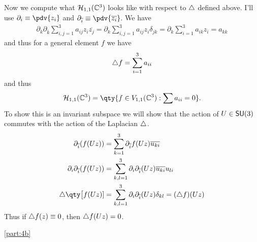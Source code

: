 \documentclass[
	pages,
	boxes,
	color=WildStrawberry
]{homework}
\theoremstyle{plain}
\begin{document}
\begin{solution}
	Now we compute what $\mathcal{H}_{1,1}(\mathbb{C}^3)$ looks like with respect to $\triangle$ defined above. I'll use $\partial_i\equiv \pdv{z_i}$ and $\partial_{\overline{i}}\equiv \pdv{\overline{z_i}}$. We have
	\begin{align*}
		\partial_k \partial_{\overline{k}}\sum_{i,j=1}^3 a_{ij}z_i\overline{z_j} = \partial_k \sum_{i,j=1}^3 a_{ij}z_i\delta_{jk} = \partial_k \sum_{i=1}^3a_{ik}z_i = a_{kk}
	\end{align*}
	and thus for a general element $f$ we have
	\begin{align*}
		\triangle{f} = \sum_{i=1}^3a_{ii}
	\end{align*}
	and thus
	\begin{equation*}
		\mathcal{H}_{1,1}(\C^3) = \qty{f\in V_{1,1}(\C^3) : \sum a_{ii} = 0}.
	\end{equation*}
	To show this is an invariant subspace we will show that the action of $U\in \mathsf{SU}(3)$ commutes with the action of the Laplacian $\triangle$.
	\begin{align*}
		\partial_{\overline{i}}(f(Uz))           & = \sum_{k = 1}^3 \partial_{\overline{i}}f(Uz)\overline{u_{ki}}                          \\
		\partial_i\partial_{\overline{i}}(f(Uz)) & = \sum_{k, l = 1}^3\partial_i\partial_{\overline{i}}(Uz)\overline{u_{ki}}u_{li}         \\
		\laplace{\qty\big[f(Uz)]}                & = \sum_{k, l = 1}^3\partial_i\partial_{\overline{i}}(Uz)\delta_{kl} = (\laplace{f})(Uz)
	\end{align*}
	Thus if $\triangle{f}(z)\equiv 0$, then $\triangle{f(Uz)} = 0$.


	\ref{part:4b}

\end{solution}
\end{document}
